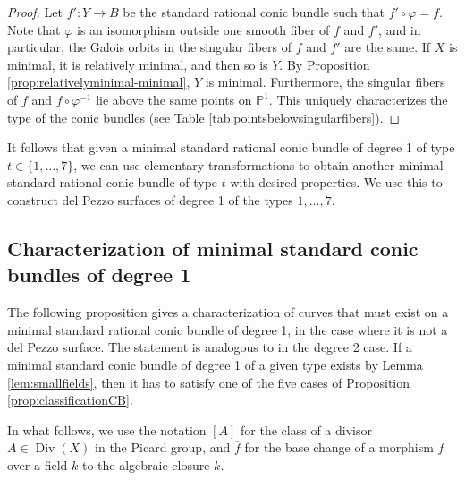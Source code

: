 \documentclass[a4paper, 11pt, reqno]{amsart}
\numberwithin{equation}{section} \numberwithin{figure}{section}
\DeclareMathOperator{\Div}{Div}
\def \P {{\mathbb P}}
\newcommand{\ra}{\rightarrow}
\theoremstyle{definition}
\numberwithin{lemma}{section}
\begin{document}
\begin{proof}
    Let $f' \colon Y \ra B$ be the standard rational conic bundle such that $f' \circ \varphi = f$. Note that $\varphi$ is an isomorphism outside one smooth fiber of $f$ and $f'$, and in particular, the Galois orbits in the singular fibers of $f$ and $f'$ are the same. If $X$ is minimal, it is relatively minimal, and then so is $Y$. By Proposition \ref{prop:relativelyminimal-minimal}, $Y$ is minimal. Furthermore, the singular fibers of $f$ and $f \circ \varphi^{-1}$ lie above the same points on $\P^1$. This uniquely characterizes the type of the conic bundles (see Table \ref{tab:pointsbelowsingularfibers}).
\end{proof}

It follows that given a minimal standard rational conic bundle of degree 1 of type $t \in \{1, \ldots, 7\}$, we can use elementary transformations to obtain another minimal standard rational conic bundle of type $t$ with desired properties. We use this to construct del Pezzo surfaces of degree 1 of the types $1, \ldots, 7$.

\subsection{Characterization of minimal standard conic bundles of degree 1}\label{sec:classificationCB}

The following proposition gives a characterization of curves that must exist on a minimal standard rational conic bundle of degree 1, in the case where it is not a del Pezzo surface. The statement is analogous to \cite[Proposition 2.3]{trepalindeg2} in the degree 2 case. If a minimal standard conic bundle of degree 1 of a given type exists by Lemma \ref{lem:smallfields}, then it has to satisfy one of the five cases of Proposition \ref{prop:classificationCB}.

In what follows, we use the notation $[A]$ for the class of a divisor $A \in \Div(X)$ in the Picard group, and $\overline{f}$ for the base change of a morphism $f$ over a field $k$ to the algebraic closure $\overline{k}$. 
\end{document}
